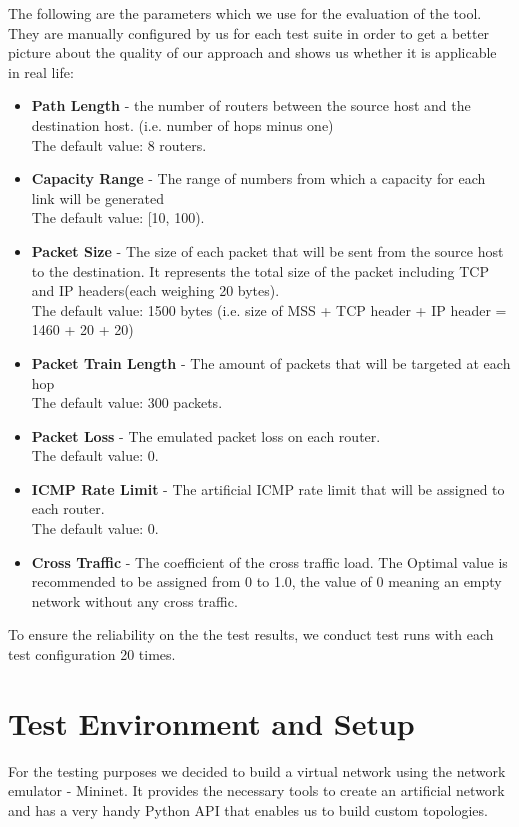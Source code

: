 The following are the parameters which we use for the evaluation of the tool. They are manually configured by us for each test suite in order to get a better picture about the quality of our approach and shows us whether it is applicable in real life:
\begin{itemize}
	\item \textbf{Path Length} - the number of routers between the source host and the destination host. (i.e. number of hops minus one)
	\\ The default value: 8 routers.
	\item \textbf{Capacity Range} - The range of numbers from which a capacity for each link will be generated
	\\ The default value: [10, 100).
	\item \textbf{Packet Size} - The size of each packet that will be sent from the source host to the destination. It represents the total size of the packet including TCP and IP headers(each weighing 20 bytes). 
	\\ The default value: 1500 bytes (i.e. size of MSS + TCP header + IP header = 1460 + 20 + 20)
	\item \textbf{Packet Train Length} - The amount of packets that will be targeted at each hop
	\\ The default value: 300 packets.
	\item \textbf{Packet Loss} - The emulated packet loss on each router.
	\\ The default value: 0.
	\item \textbf{ICMP Rate Limit} - The artificial ICMP rate limit that will be assigned to each router. 
	\\ The default value: 0.
	\item \textbf{Cross Traffic} - The coefficient of the cross traffic load. The Optimal value is recommended to be assigned from 0 to 1.0, the value of 0 meaning an empty network without any cross traffic. 
\end{itemize}

To ensure the reliability on the the test results, we conduct test runs with each test configuration 20 times.

\section{Test Environment and Setup}
For the testing purposes we decided to build a virtual network using the network emulator - Mininet\cite{mnHome}. It provides the necessary tools to create an artificial network and has a very handy Python API that enables us to build custom topologies.


